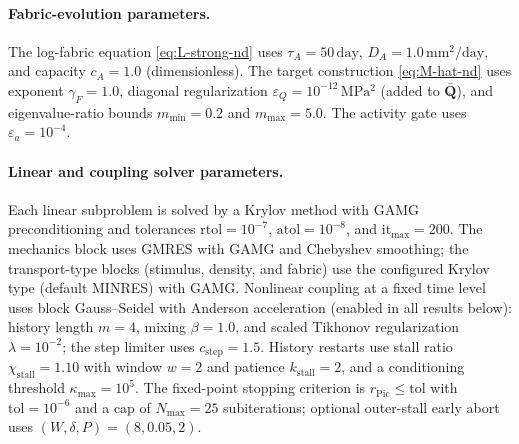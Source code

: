 \paragraph{Fabric-evolution parameters.}
The log-fabric equation \eqref{eq:L-strong-nd} uses $\tau_A=50\,\mathrm{day}$, $D_A=1.0\,\mathrm{mm^2/day}$, and capacity $c_A=1.0$ (dimensionless). The target construction \eqref{eq:M-hat-nd} uses exponent $\gamma_F=1.0$, diagonal regularization $\varepsilon_Q=10^{-12}\,\mathrm{MPa^2}$ (added to $\bar{\mathbf Q}$), and eigenvalue-ratio bounds $m_{\min}=0.2$ and $m_{\max}=5.0$. The activity gate uses $\varepsilon_a=10^{-4}$.

\paragraph{Linear and coupling solver parameters.}
Each linear subproblem is solved by a Krylov method with GAMG preconditioning and tolerances $\mathrm{rtol}=10^{-7}$, $\mathrm{atol}=10^{-8}$, and $\mathrm{it}_{\max}=200$. The mechanics block uses GMRES with GAMG and Chebyshev smoothing; the transport-type blocks (stimulus, density, and fabric) use the configured Krylov type (default MINRES) with GAMG. Nonlinear coupling at a fixed time level uses block Gauss--Seidel with Anderson acceleration (enabled in all results below): history length $m=4$, mixing $\beta=1.0$, and scaled Tikhonov regularization $\lambda=10^{-2}$; the step limiter uses $c_{\mathrm{step}}=1.5$. History restarts use stall ratio $\chi_{\mathrm{stall}}=1.10$ with window $w=2$ and patience $k_{\mathrm{stall}}=2$, and a conditioning threshold $\kappa_{\max}=10^{5}$. The fixed-point stopping criterion is $r_{\mathrm{Pic}}\le \mathrm{tol}$ with $\mathrm{tol}=10^{-6}$ and a cap of $N_{\max}=25$ subiterations; optional outer-stall early abort uses $(W,\delta,P)=(8,0.05,2)$.

